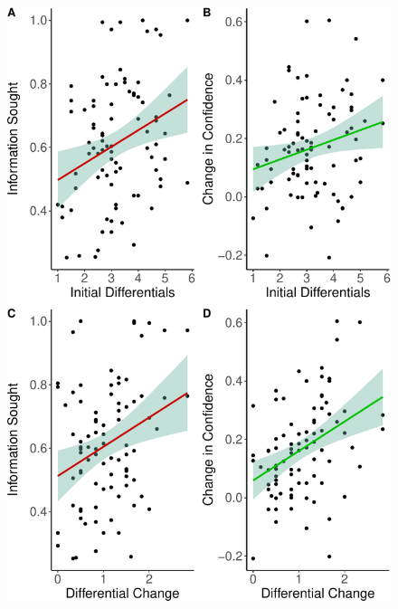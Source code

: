 \documentclass[a4paper, nobind]{templates/ociamthesis}
\begin{document}
\newpage

\begin{figure}[H]

{\centering \includegraphics[width=1\linewidth]{_main_files/figure-latex/diffsPlot-1} 

}


\end{figure}
\end{document}
